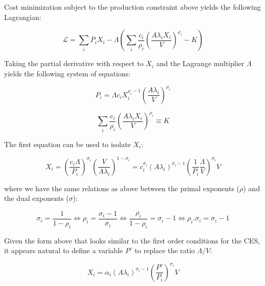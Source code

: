 Cost minimization subject to the production constraint above yields the following Lagrangian:

\begin{displaymath}
\mathcal{L}=\sum\limits_{i}{{{P}_{i}}{{X}_{i}}} - \Lambda \left(
\sum\limits_{i}{ \frac{c_i}{\rho_i}\left( \frac{A \lambda_i X_i}{V}\right)^{\rho_i}} - K \right)
\end{displaymath}

\noindent Taking the partial derivative with respect to $X_i$ and the Lagrange multiplier $\Lambda$ yields the
following system of equations:

\begin{equation}
\label{eq:creshFOC1}
P_i=\Lambda c_i X_{i}^{\rho_i -1}
	\left( \frac{A \lambda _{i}} {V} \right)^{\rho_i}
\end{equation}

\begin{equation}
\label{eq:creshFOC2}
\sum\limits_{i}{ \frac{c_i}{\rho_i}\left( \frac{A \lambda_i X_i}{V}\right)^{\rho_i}} \equiv K
\end{equation}

\noindent The first equation can be used to isolate $X_i$:

\begin{equation}
\label{eq:creshx}
X_i = \left( \frac{c_i\Lambda}{P_i}\right)^{\sigma_i} \left(\frac{V}{A \lambda_i}\right)^{1-\sigma_i}
= c_i^{\sigma_i} \left( A \lambda_i\right)^{\sigma_i-1} \left( \frac{1} {P_i} \frac{\Lambda}{V}\right)^{\sigma_i} V
\end{equation}

\noindent where we have the same relations as above between the primal exponents ($\rho$) and
the dual exponents ($\sigma$):

\begin{displaymath}
\sigma_i =\frac{1}{1-\rho_i }\Leftrightarrow \rho_i =\frac{\sigma_i -1}{\sigma_i }
\Leftrightarrow \frac{\rho_i }{1-\rho_i }=\sigma_i -1\Leftrightarrow \rho_i .\sigma_i =\sigma_i -1
\end{displaymath}

\noindent Given the form above that looks similar to the first order conditions for the CES, it
appears natural to define a variable $P^c$ to replace the ratio $\Lambda/V$:

\begin{equation}
\label{eq:creshx2}
X_i = \alpha_i \left( A \lambda_i\right)^{\sigma_i-1} \left( \frac{P^c} {P_i} \right)^{\sigma_i} V
\end{equation}

